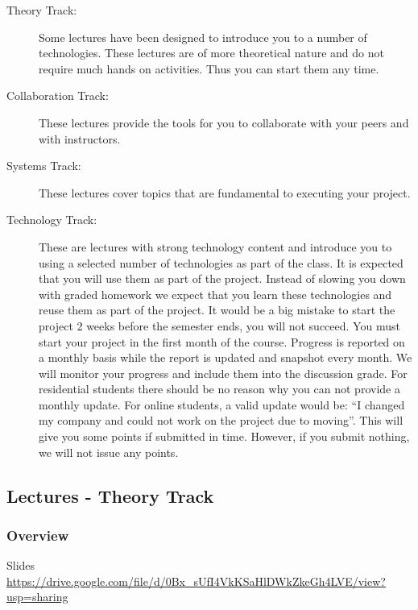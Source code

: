 \begin{description}

\item[Theory Track:]
Some lectures have been designed to introduce you to a number of
technologies. These lectures are of more theoretical nature and do not
require much hands on activities. Thus you can start them any time.

\item[Collaboration Track:]
These lectures provide the tools for you to collaborate with your peers
and with instructors.

\item[Systems Track:]
These lectures cover topics that are fundamental to executing your
project.

\item[Technology Track:]
These are lectures with strong technology content and introduce you to
using a selected number of technologies as part of the class. It is
expected that you will use them as part of the project. Instead of
slowing you down with graded homework we expect that you learn these
technologies and reuse them as part of the project. It would be a big
mistake to start the project 2 weeks before the semester ends, you will
not succeed. You must start your project in the first month of the
course. Progress is reported on a monthly basis while the report is
updated and snapshot every month. We will monitor your progress and
include them into the discussion grade. For residential students there
should be no reason why you can not provide a monthly update. For online
students, a valid update would be: ``I changed my company and could not
work on the project due to moving''. This will give you some points if
submitted in time. However, if you submit nothing, we will not issue any
points.

\end{description}

\subsection{Lectures - Theory Track}\label{lectures---theory-track}

\subsubsection{Overview}

Slides \url{https://drive.google.com/file/d/0Bx_sUfI4VkKSaHlDWkZkeGh4LVE/view?usp=sharing}

